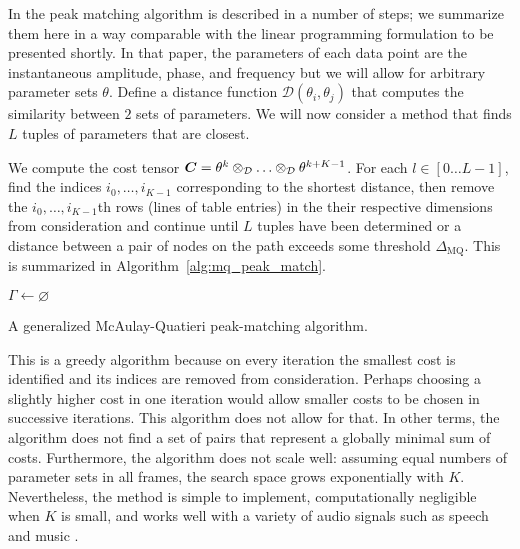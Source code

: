 \documentclass{article}
\def\argmin{\mathop{\rm arg\,min}}
\newcommand{\D}{\displaystyle}
\newcommand{\BS}[1]{\boldsymbol{#1}}
\begin{document}
\begin{sloppy}
In \cite[p.~748]{mcaulay1986speech} the peak matching algorithm is described in
a number of steps; we summarize them here in a way comparable with the linear
programming formulation to be presented shortly. In that paper, the parameters
of each data point are the instantaneous amplitude, phase, and frequency but we
will allow for arbitrary parameter sets $\theta$.  Define a distance function
$\mathcal{D} \left( \theta_{i},\theta_{j} \right)$ that computes the
similarity between $2$ sets of parameters. We will now consider a method that
finds $L$ tuples of parameters that are closest.

We compute the cost tensor
$
    \BS{C} = \theta^{k}
    \otimes_{\mathcal{D}} \mathellipsis \otimes_{\mathcal{D}} \theta^{k+K-1}
$.
For each $l \in \left[0 \dotsc L-1 \right]$, find the indices
$i_{0},\dotsc,i_{K-1}$ 
corresponding to the shortest
distance, then remove the $i_{0},\dotsc,i_{K-1}$th rows (lines of table entries)
in the their respective dimensions from consideration
and continue until $L$ tuples have been determined or a distance between a pair
of nodes on the path
exceeds some
threshold $\Delta_{\text{MQ}}$. This is summarized in
Algorithm~\ref{alg:mq_peak_match}.

\begin{algorithm}
    \KwIn{the cost matrix $\BS{C}$}
    $\Gamma \leftarrow \varnothing$\;
    \For{$l \leftarrow 0$ to $L-1$}{
        $\D \Gamma_{l}=\argmin_{[0,\dotsc,M_{0}-1] \times
        \mathellipsis \times [0,\dotsc,M_{K-1}-1] \setminus \Gamma}
            \BS{C}$\;
            \If{$ \exists i,j \in \Gamma_{l} : 
            \mathcal{D} \left( \theta_{i},\theta_{j} \right) > \Delta_{\text{MQ}}$}{
            \KwRet{$\Gamma$}
        }
        $\Gamma \leftarrow \Gamma \cup C_{\Gamma_{l}}$\;
    }
    \KwRet{$\Gamma$}
    \caption{A generalized McAulay-Quatieri peak-matching algorithm.}%
    \label{alg:mq_peak_match}
\end{algorithm}

This is a greedy algorithm because on every iteration the smallest cost is
identified and its indices are removed from consideration. Perhaps choosing a
slightly higher cost in one iteration would allow smaller costs to be chosen in
successive iterations. This algorithm does not allow for that. In other terms,
the algorithm does not find a set of pairs that represent a globally minimal sum of
costs.
Furthermore, the algorithm does not scale well: assuming equal numbers of
parameter sets in all frames, the search space grows exponentially with
$K$. Nevertheless, the method is simple to implement, computationally negligible
when $K$ is small, and works well with a variety of audio signals such as speech
\cite{mcaulay1986speech} and music
\cite{smith1987parshl}.


\end{sloppy}
\end{document}
